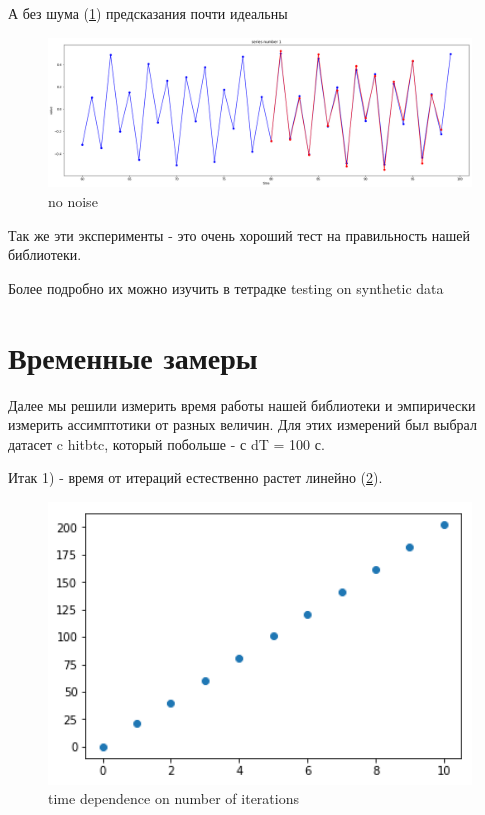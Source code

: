 \documentclass[11pt]{article}
\begin{document}
А без шума (\ref{fig:no_noise}) предсказания почти идеальны

\begin{figure}[!htb]
\includegraphics[width = 15cm]{no_noise.png}
\caption{no noise}
\label{fig:no_noise}
\end{figure} 

Так же эти эксперименты - это очень хороший тест на правильность нашей библиотеки.

Более подробно их можно изучить в тетрадке testing on synthetic data

\section{Временные замеры}
Далее мы решили измерить время работы нашей библиотеки и эмпирически измерить ассимптотики от разных величин. 
Для этих измерений был выбрал датасет c hitbtc, который побольше - с dT = 100 с. 

Итак 1) - время от итераций естественно растет линейно (\ref{fig:iteration_measurements}). 

\begin{figure}[!htb]
\includegraphics[width = 15cm]{iteration_measurements.png}
\caption{time dependence on number of iterations}
\label{fig:iteration_measurements}
\end{figure} 
\end{document}
